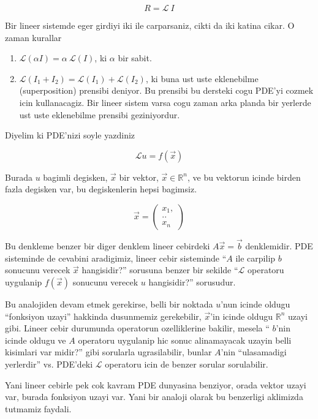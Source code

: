 \documentclass[12pt,fleqn]{article}
\begin{document}
\[ R = \mathcal{L} \ I \]

Bir lineer sistemde eger girdiyi iki ile carparsaniz, cikti da iki katina
cikar. O zaman kurallar

\begin{enumerate}

   \item $\mathcal{L}(\alpha I) = \alpha \ \mathcal{L}(I)$, ki $\alpha$ bir sabit.

   \item $\mathcal{L}(I_1 + I_2) = \mathcal{L}(I_1) + \mathcal{L}(I_2)$, ki buna ust uste eklenebilme
     (superposition) prensibi deniyor. Bu prensibi bu dersteki cogu PDE'yi
     cozmek icin kullanacagiz. Bir lineer sistem varsa cogu zaman arka
     planda bir yerlerde ust uste eklenebilme prensibi geziniyordur. 

\end{enumerate}

Diyelim ki PDE'nizi soyle yazdiniz

\[\mathcal{L}u = f(\vec{x}) \]

Burada $u$ bagimli degisken, $\vec{x}$ bir vektor, $\vec{x} \in \mathbb{R} ^n$, ve
bu vektorun icinde birden fazla degisken var, bu degiskenlerin hepsi
bagimsiz.

\[ 
\vec{x} = 
\left(\begin{array}{r}
x_1,\\
.. \\
x_n
\end{array}\right)
 \]

Bu denkleme benzer bir diger denklem lineer cebirdeki $A\vec{x} = \vec{b}$
denklemidir.  PDE sisteminde de cevabini aradigimiz, lineer cebir
sisteminde ``$A$ ile carpilip $b$ sonucunu verecek $\vec{x}$ hangisidir?''
sorusuna benzer bir sekilde ``$\mathcal{L}$ operatoru uygulanip $f(\vec{x})$
sonucunu verecek $u$ hangisidir?'' sorusudur.

Bu analojiden devam etmek gerekirse, belli bir noktada $u$'nun icinde
oldugu ``fonksiyon uzayi'' hakkinda dusunmemiz gerekebilir, $\vec{x}$'in
icinde oldugu $\mathbb{R}^n$ uzayi gibi. Lineer cebir durumunda operatorun
ozelliklerine bakilir, mesela `` $b$'nin icinde oldugu ve $A$ operatoru
uygulanip hic sonuc alinamayacak uzayin belli kisimlari var
midir?'' gibi sorularla ugrasilabilir, bunlar $A$'nin ``ulasamadigi
yerlerdir'' vs. PDE'deki $\mathcal{L}$ operatoru icin de benzer sorular sorulabilir. 

Yani lineer cebirle pek cok kavram PDE dunyasina benziyor, orada vektor
uzayi var, burada fonksiyon uzayi var. Yani bir analoji olarak bu
benzerligi aklimizda tutmamiz faydali. 
\end{document}
